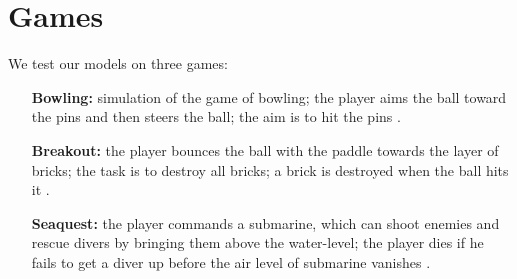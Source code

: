 \section{Games}
We test our models on three games: 
\begin{itemize}[itemindent=28pt]
  \item[\textbf{Bowling:}]{simulation of the game of bowling; the player aims the ball toward the pins and then steers the ball; the aim is to hit the pins \cite{bowling,bowling_man}.}
  \item[\textbf{Breakout:}]{the player bounces the ball with the paddle towards the layer of bricks; the task is to destroy all bricks; a brick is destroyed when the ball hits it \cite{breakout,breakout_man}.}
  \item[\textbf{Seaquest:}]{the player commands a submarine, which can shoot enemies and rescue divers by bringing them above the water-level; the player dies if he fails to get a diver up before the air level of submarine vanishes \cite{seaquest,seaquest_man}.}
\end{itemize}
